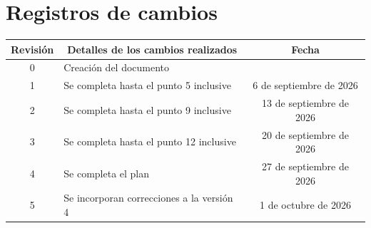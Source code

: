 \documentclass[
11pt, %
]{charter}
\begin{document}
	
	\maketitle
	\thispagestyle{empty}
	\pagebreak
	
	
	\thispagestyle{empty}
	{\setlength{\parskip}{0pt}
		\tableofcontents{}
	}
	\pagebreak
	
	
	\section*{Registros de cambios}
	\label{sec:registro}
	
	
	\begin{table}[ht]
		\label{tab:registro}
		\centering
		\begin{tabularx}{\linewidth}{@{}|c|X|c|@{}}
			\hline
			\rowcolor[HTML]{C0C0C0} 
			Revisión & \multicolumn{1}{c|}{\cellcolor[HTML]{C0C0C0}Detalles de los cambios realizados} & Fecha      \\ \hline
			0      & Creación del documento                                 &\fechaInicioName \\ \hline
			1      & Se completa hasta el punto 5 inclusive                 & 6 de septiembre de 2026 \\ \hline
			2      & Se completa hasta el punto 9 inclusive                 & 13 de septiembre de 2026 \\ \hline
			3      & Se completa hasta el punto 12 inclusive                & 20 de septiembre de 2026 \\ \hline
			4      & Se completa el plan	                                & 27 de septiembre de 2026 \\ \hline
			5      & Se incorporan correcciones a la versión 4	                & 1 de octubre de 2026 \\ \hline
			
			
		\end{tabularx}
	\end{table}
	
\end{document}
